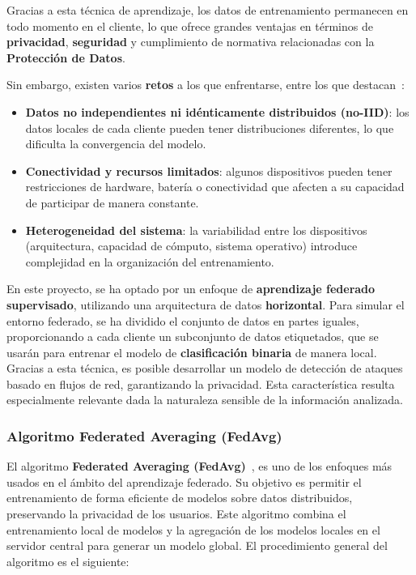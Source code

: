 
Gracias a esta técnica de aprendizaje, los datos de entrenamiento permanecen en todo momento en el cliente, lo que ofrece grandes ventajas en términos de \textbf{privacidad}, \textbf{seguridad} y cumplimiento de normativa relacionadas con la \textbf{Protección de Datos}.

Sin embargo, existen varios \textbf{retos} a los que enfrentarse, entre los que destacan~\cite{aprendizaje_federado_articulo}:

\begin{itemize}
    \item \textbf{Datos no independientes ni idénticamente distribuidos (no-IID)}: los datos locales de cada cliente pueden tener distribuciones diferentes, lo que dificulta la convergencia del modelo.
    
    \item \textbf{Conectividad y recursos limitados}: algunos dispositivos pueden tener restricciones de hardware, batería o conectividad que afecten a su capacidad de participar de manera constante.
    
    \item \textbf{Heterogeneidad del sistema}: la variabilidad entre los dispositivos (arquitectura, capacidad de cómputo, sistema operativo) introduce complejidad en la organización del entrenamiento.
\end{itemize}

En este proyecto, se ha optado por un enfoque de \textbf{aprendizaje federado supervisado}, utilizando una arquitectura de datos \textbf{horizontal}. Para simular el entorno federado, se ha dividido el conjunto de datos en partes iguales, proporcionando a cada cliente un subconjunto de datos etiquetados, que se usarán para entrenar el modelo de \textbf{clasificación binaria} de manera local. Gracias a esta técnica, es posible desarrollar un modelo de detección de ataques basado en flujos de red, garantizando la privacidad. Esta característica resulta especialmente relevante dada la naturaleza sensible de la información analizada.

\subsubsection{Algoritmo Federated Averaging (FedAvg)}
\label{subsubsec:FedAvg}
El algoritmo \textbf{Federated Averaging (FedAvg)}~\cite{aprendizaje_federado_articulo}, es uno de los enfoques más usados en el ámbito del aprendizaje federado. Su objetivo es permitir el entrenamiento de forma eficiente de modelos sobre datos distribuidos, preservando la privacidad de los usuarios. Este algoritmo combina el entrenamiento local de modelos y la agregación de los modelos locales en el servidor central para generar un modelo global. El procedimiento general del algoritmo es el siguiente:

